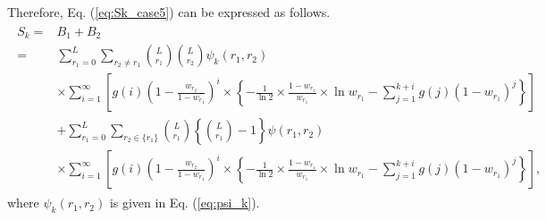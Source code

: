 %
Therefore, Eq. (\ref{eq:Sk_case5}) can be expressed as follows.
\begin{align}\begin{split}
  S_k =& B_1 + B_2 \\
  =& \sum_{r_1=0}^{L} \sum_{r_2 \neq r_1} \binom{L}{r_1}\binom{L}{r_2}\psi_k(r_1,r_2)\\
  &\times\sum_{i=1}^{\infty} \left[ g(i) \left(1-\frac{w_{r_2}}{1-w_{r_1}} \right)^{i} \times \left\{ -\frac{1}{\ln 2} \times \frac{1-w_{r_1}}{w_{r_1}} \times \ln w_{r_1} - \sum_{j=1}^{k+i} g(j)(1-w_{r_1})^{j} \right\} \right] \\
  &+\sum_{r_1=0}^{L} \sum_{r_2 \in \{r_1\}} \binom{L}{r_1}\left\{\binom{L}{r_1}-1\right\} \psi(r_1,r_2) \\
  &\times\sum_{i=1}^{\infty} \left[ g(i) \left(1-\frac{w_{r_2}}{1-w_{r_1}} \right)^{i} \times \left\{ -\frac{1}{\ln 2} \times \frac{1-w_{r_1}}{w_{r_1}} \times \ln w_{r_1} - \sum_{j=1}^{k+i} g(j)(1-w_{r_1})^{j} \right\} \right],
\end{split}\end{align}
where $\psi_k(r_1,r_2)$ is given in Eq. (\ref{eq:psi_k}).


















